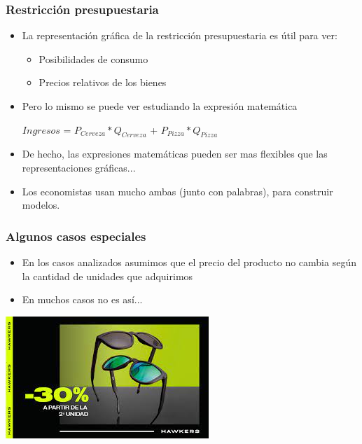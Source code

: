 \documentclass{beamer}
\begin{document}
\begin{frame}
\frametitle{Restricción presupuestaria}
\begin{itemize}
    \item La representación gráfica de la restricción presupuestaria es útil para ver:
    \begin{itemize}
        \item Posibilidades de consumo
        \item Precios relativos de los bienes
    \end{itemize}
    \item Pero lo mismo se puede ver estudiando la expresión matemática \\ \vspace{2mm}
    \begin{center}
    $Ingresos$ = $P_{Cerveza} * Q_{Cerveza}$ + $P_{Pizza} * Q_{Pizza}$
    \\
    \end{center}\vspace{2mm}
    \item De hecho, las expresiones matemáticas pueden ser mas flexibles que las representaciones gráficas...
    \item Los economistas usan mucho ambas (junto con palabras), para construir modelos.
\end{itemize} 
\end{frame}

\begin{frame}
\frametitle{Algunos casos especiales}
\begin{itemize}
\item En los casos analizados asumimos que el precio del producto no cambia según la cantidad de unidades que adquirimos
\item En muchos casos no es así...
\end{itemize}
\vspace{3mm}
\centering
\includegraphics[scale=0.55]{Slides Principios de Economia/Figures/Lentes.jpeg}
\end{frame}
\end{document}
